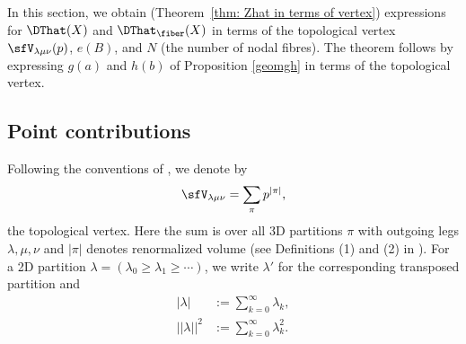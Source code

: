 
In this section, we obtain (Theorem~\ref{thm: Zhat in terms of
vertex}) expressions for $\DThat (X)$ and $\DThat_{\fiber }(X)$ in
terms of the topological vertex $\sfV_{\lambda\mu\nu}(p)$, $e(B)$, and
$N$ (the number of nodal fibres). The theorem follows by expressing
$g(a)$ and $h(b)$ of Proposition \ref{geomgh} in terms of the
topological vertex.


\subsection{Point contributions}   

Following the conventions of \cite{Bryan-Kool-Young}, we denote by 
$$
\sfV_{\lambda\mu\nu} = \sum_{\pi} p^{|\pi|}, 
$$
the topological vertex. Here the sum is over all 3D partitions $\pi$
with outgoing legs $\lambda, \mu, \nu$ and $|\pi|$ denotes
renormalized volume (see Definitions (1) and (2) in \cite{Bryan-Kool-Young}). For a
2D partition $\lambda = (\lambda_0 \geq \lambda_1 \geq \cdots)$, we
write $\lambda'$ for the corresponding transposed partition and
\begin{align*}
|\lambda| &:= \sum_{k=0}^{\infty} \lambda_k, \\
|\!|\lambda|\!|^2 &:= \sum_{k=0}^{\infty} \lambda_{k}^{2}.
\end{align*}

